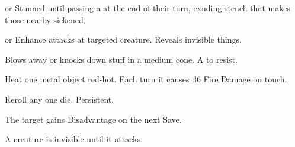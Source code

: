 \documentclass[itdr]{subfiles}
\begin{document}
\begin{enumerate}
	\item {}  or Stunned until passing a   at the end of their turn, exuding stench that makes those nearby sickened.
	\item {}  or Enhance attacks at targeted creature. Reveals invisible things.
	\item {} Blows away or knocks down stuff in a medium cone. A  to resist.
	\item {} Heat one metal object red-hot. Each turn it causes d6 Fire Damage on touch.
	\item {} Reroll any one die. Persistent.
	\item {} The target gains Disadvantage on the next Save.

	\begin{minipage}{\columnwidth}
	\item {} A creature is invisible until it attacks.
	\end{minipage}

	\break


\end{enumerate}
\end{document}
